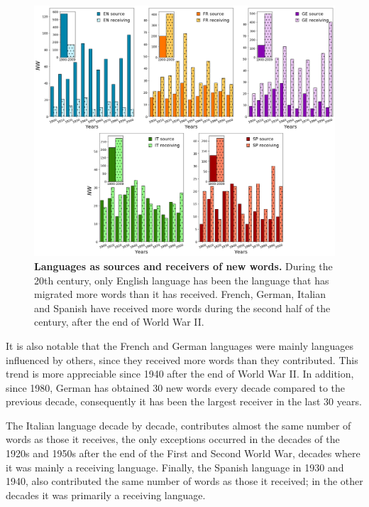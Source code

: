 \documentclass[10pt,letterpaper]{article} %
\begin{document}
\begin{figure}[!h]
	\begin{adjustwidth}{-1.2in}{0in}
	\includegraphics[scale=.35]{NW_OR.png}
	\caption{{\bf Languages as sources and receivers of new words.} 
During
the 20th century, only English language has been the language that has migrated
more words than it has received. French, German, Italian and Spanish have
received more words during the second half of the century, after the end of
World War II.}
	\label{fig.NMW_OR}
	\end{adjustwidth}
\end{figure}

It is also notable that the French and German languages were mainly
languages influenced by others, since they received more words than
they contributed. This trend is more appreciable since 1940 after the end of
World War II. In addition, since 1980, German has obtained 30 new words every
decade compared to the previous decade, consequently it has been the largest
receiver in the last 30 years.

The Italian language decade by decade, contributes almost the same number of words as those it receives, the only exceptions occurred in the decades of the 1920s and 1950s after the end of the First and Second World War, decades where it was mainly a receiving language. Finally, the Spanish language in 1930 and 1940, also contributed the same number of words as those it received; in the other decades it was primarily a receiving language.
\end{document}
